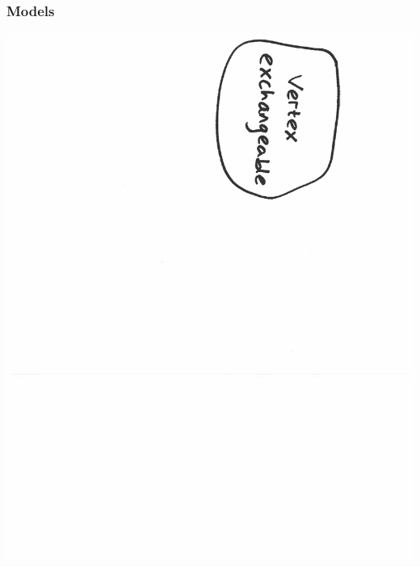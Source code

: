 \documentclass[final,hyperref={pdfpagelabels=false},noamsthm]{beamer}
\begin{document}
\begin{frame}
	\frametitle{Models}
	\includegraphics[angle=90,origin=c,scale=0.4]{fig/models1}
\end{frame}
\end{document}
